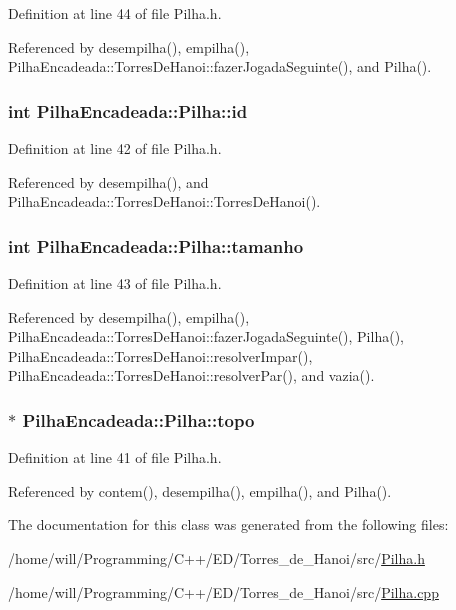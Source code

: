 Definition at line 44 of file Pilha.h.



Referenced by desempilha(), empilha(), PilhaEncadeada::TorresDeHanoi::fazerJogadaSeguinte(), and Pilha().

\hypertarget{classPilhaEncadeada_1_1Pilha_aae9cbeca741bf5ef1fbae7a6aba3ae64}{
\subsubsection[{id}]{\setlength{\rightskip}{0pt plus 5cm}int {\bf PilhaEncadeada::Pilha::id}}}
\label{classPilhaEncadeada_1_1Pilha_aae9cbeca741bf5ef1fbae7a6aba3ae64}


Definition at line 42 of file Pilha.h.



Referenced by desempilha(), and PilhaEncadeada::TorresDeHanoi::TorresDeHanoi().

\hypertarget{classPilhaEncadeada_1_1Pilha_ae5b7e5d7daefb67f057320b4740444ab}{
\subsubsection[{tamanho}]{\setlength{\rightskip}{0pt plus 5cm}int {\bf PilhaEncadeada::Pilha::tamanho}}}
\label{classPilhaEncadeada_1_1Pilha_ae5b7e5d7daefb67f057320b4740444ab}


Definition at line 43 of file Pilha.h.



Referenced by desempilha(), empilha(), PilhaEncadeada::TorresDeHanoi::fazerJogadaSeguinte(), Pilha(), PilhaEncadeada::TorresDeHanoi::resolverImpar(), PilhaEncadeada::TorresDeHanoi::resolverPar(), and vazia().

\hypertarget{classPilhaEncadeada_1_1Pilha_a061ad72a4dfdb0f0135c61d564801299}{
\subsubsection[{topo}]{$\ast$ {\bf PilhaEncadeada::Pilha::topo}}}
\label{classPilhaEncadeada_1_1Pilha_a061ad72a4dfdb0f0135c61d564801299}


Definition at line 41 of file Pilha.h.



Referenced by contem(), desempilha(), empilha(), and Pilha().



The documentation for this class was generated from the following files:\begin{DoxyCompactItemize}
\item 
/home/will/Programming/C++/ED/Torres\_\-de\_\-Hanoi/src/\hyperlink{Pilha_8h}{Pilha.h}\item 
/home/will/Programming/C++/ED/Torres\_\-de\_\-Hanoi/src/\hyperlink{Pilha_8cpp}{Pilha.cpp}\end{DoxyCompactItemize}
